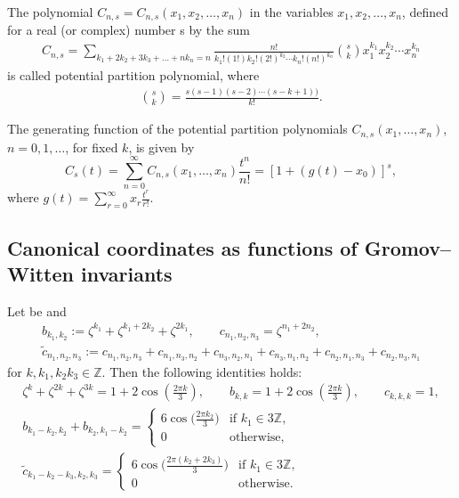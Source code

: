 \begin{Definition}
The polynomial $C_{n,s}=C_{n,s}(x_1,x_2,\dots,x_n)$ in the variables $x_1,x_2,\dots,\allowbreak x_n$, defined for a real (or complex) number s by the sum
\begin{gather*}
C_{n,s}=\sum_{ k_1+2k_2+3k_3+\dots +nk_{n}=n} \frac{n!}{k_1!(1!)k_2!(2!)^{k_2}\cdots k_n!(n!)^{k_n}}{{s}\choose{k}} x_1^{k_1}x_2^{k_2}\cdots x_n^{k_n}
\end{gather*}
 is called potential partition polynomial,
 where
 \begin{gather*}
 {{s}\choose{k}}=\frac{s(s-1)(s-2)\cdots (s-k+1))}{k!}.
 \end{gather*}
\end{Definition}


\begin{Theorem}\label{theorem potential partition polynomials}
The generating function of the potential partition polynomials $C_{n,s}(x_1,\dots,\allowbreak x_n)$, $n=0,1,\dots$, for fixed $k$, is given by
 \[%
C_{s}(t)=\sum_{n=0}^{\infty} C_{n,s}(x_1,\dots, x_n)\frac{t^n}{n!}=[ 1+(g(t)-x_0) ]^s ,
\]
where
$g(t)=\sum_{r=0}^{\infty} x_r \frac{t^r}{r!}$.
\end{Theorem}

\subsection{Canonical coordinates as functions of Gromov--Witten invariants}\label{Canonical coordinates as functions of Gromov Witten invariants}

\begin{Lemma}\label{lemma of exp 2pi 3}
Let be  and
\begin{gather*}
b_{k_1,k_2}:=\zeta^{k_1}+\zeta^{k_1+2k_2}+\zeta^{2k_1},\qquad
c_{n_1,n_2,n_3}=\zeta^{n_1+2n_2},\\
\tilde c_{n_1,n_2,n_3}:=c_{n_1,n_2,n_3}+c_{n_1,n_3,n_2}+c_{n_3,n_2,n_1}+c_{n_3,n_1,n_2}+c_{n_2,n_1,n_3}+c_{n_2,n_3,n_1}
\end{gather*}
for $k,k_1,k_2 k_3 \in \mathbb{Z}$. Then the following identities holds:
\begin{gather}
\zeta^{k}+\zeta^{2k}+\zeta^{3k}=1+2\cos\left(\frac{2\pi k}{3} \right),\qquad
b_{k,k}=1+2\cos\left(\frac{2\pi k}{3} \right),\qquad
c_{k,k,k}=1,
\nonumber\\
 b_{k_1-k_2,k_2}+b_{k_2,k_1-k_2}=
\begin{cases}
 6\cos\bigl( \frac{2\pi k_2}{3}\bigr)& \text{if } k_1\in 3\mathbb{Z},\\
 0 & \text{otherwise},
\end{cases}\nonumber
\\
\tilde c_{k_1-k_2-k_3,k_2,k_3}=
\begin{cases}
 6\cos\bigl( \frac{2\pi (k_2+2k_3)}{3}\bigr)& \text{if } k_1\in 3\mathbb{Z},\\
 0 & \text{otherwise}.
\end{cases}\label{exp 2pi 3 id}
\end{gather}
\end{Lemma}

